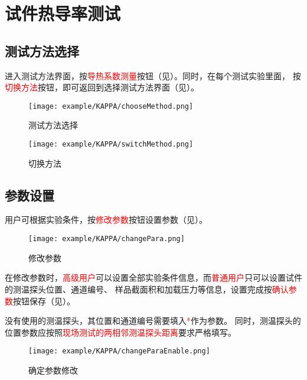 \section{试件热导率测试}
\subsection{测试方法选择}
进入测试方法界面，按\textcolor{red}{导热系数测量}按钮（见）。同时，在每个测试实验里面，
按\textcolor{red}{切换方法}按钮，即可返回到选择测试方法界面（见）。
\begin{figure}[htbp]
	\centering
	\texttt{[image: example/KAPPA/chooseMethod.png]}
	\caption{ 测试方法选择 \label{fig:exmp_kappa_chooseMethod}}
\end{figure}

\begin{figure}[htbp]
	\centering
	\texttt{[image: example/KAPPA/switchMethod.png]}
	\caption{ 切换方法 \label{fig:exmp_kappa_switchMethod}}
\end{figure}

\subsection{参数设置}
用户可根据实验条件，按\textcolor{red}{修改参数}按钮设置参数（见）。
\begin{figure}[htbp]
	\centering
	\texttt{[image: example/KAPPA/changePara.png]}
	\caption{ 修改参数 \label{fig:exmp_kappa_changePara}}
\end{figure}
在修改参数时，\textcolor{red}{高级用户}可以设置全部实验条件信息，而\textcolor{red}{普通用户}只可以设置试件的测温探头位置、通道编号、
样品截面积和加载压力等信息，设置完成按\textcolor{red}{确认参数}按钮保存（见）。
\begin{note}
没有使用的测温探头，其位置和通道编号需要填入\textcolor{red}{*}作为参数。
同时，测温探头的位置参数应按照\textcolor{red}{现场测试的两相邻测温探头距离}要求严格填写。
\end{note}
\begin{figure}[htbp]
	\centering
	\texttt{[image: example/KAPPA/changeParaEnable.png]}
	\caption{ 确定参数修改 \label{fig:exmp_kappa_changeParaEnable}}
\end{figure}
~\\
